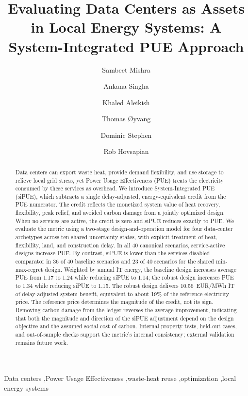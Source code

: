 \documentclass[preprint,12pt]{elsarticle}
\begin{document}
\begin{frontmatter}


\title{Evaluating Data Centers as Assets in Local Energy Systems: A System-Integrated PUE Approach}

\author[usn]{Sambeet Mishra}
\author[usn]{Ankana Singha}
\author[usn]{Khaled Aleikish}
\author[usn]{Thomas {\O}yvang}
\author[bax]{Dominic Stephen}
\author[srnl]{Rob Hovsapian}

\address[usn]{University of South-Eastern Norway, Porsgrunn, Norway}
\address[bax]{Bax Innovation, Barcelona, Spain}
\address[srnl]{Savannah River National Laboratory, USA}


\begin{abstract}
Data centers can export waste heat, provide demand flexibility, and use storage to relieve local grid stress, yet Power Usage Effectiveness (PUE) treats the electricity consumed by these services as overhead. We introduce System-Integrated PUE (siPUE), which subtracts a single delay-adjusted, energy-equivalent credit from the PUE numerator. The credit reflects the monetized system value of heat recovery, flexibility, peak relief, and avoided carbon damage from a jointly optimized design. When no services are active, the credit is zero and siPUE reduces exactly to PUE. We evaluate the metric using a two-stage design-and-operation model for four data-center archetypes across ten shared uncertainty states, with explicit treatment of heat, flexibility, land, and construction delay. In all 40 canonical scenarios, service-active designs increase PUE. By contrast, siPUE is lower than the services-disabled comparator in 36 of 40 baseline scenarios and 23 of 40 scenarios for the shared min-max-regret design. Weighted by annual IT energy, the baseline design increases average PUE from 1.17 to 1.24 while reducing siPUE to 1.14; the robust design increases PUE to 1.34 while reducing siPUE to 1.15. The robust design delivers 10.56~EUR/MWh IT of delay-adjusted system benefit, equivalent to about 19\% of the reference electricity price. The reference price determines the magnitude of the credit, not its sign. Removing carbon damage from the ledger reverses the average improvement, indicating that both the magnitude and direction of the siPUE adjustment depend on the design objective and the assumed social cost of carbon. Internal property tests, held-out cases, and out-of-sample checks support the metric's internal consistency; external validation remains future work.
\end{abstract}

\begin{keyword}
Data centers \sep Power Usage Effectiveness \sep waste-heat reuse \sep optimization \sep local energy systems

\end{keyword}

\end{frontmatter}
\end{document}
